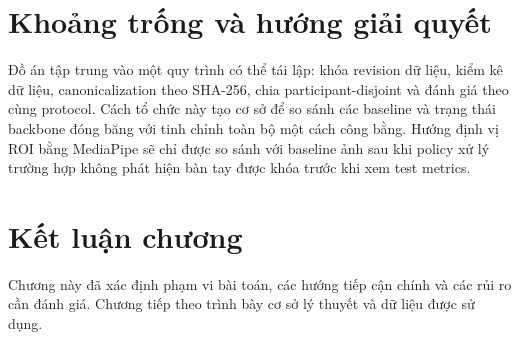 \section{Khoảng trống và hướng giải quyết}
Đồ án tập trung vào một quy trình có thể tái lập: khóa revision dữ liệu, kiểm kê dữ liệu, canonicalization theo SHA-256, chia participant-disjoint và đánh giá theo cùng protocol. Cách tổ chức này tạo cơ sở để so sánh các baseline và trạng thái backbone đóng băng với tinh chỉnh toàn bộ một cách công bằng. Hướng định vị ROI bằng MediaPipe sẽ chỉ được so sánh với baseline ảnh sau khi policy xử lý trường hợp không phát hiện bàn tay được khóa trước khi xem test metrics.

\section{Kết luận chương}
Chương này đã xác định phạm vi bài toán, các hướng tiếp cận chính và các rủi ro cần đánh giá. Chương tiếp theo trình bày cơ sở lý thuyết và dữ liệu được sử dụng.
